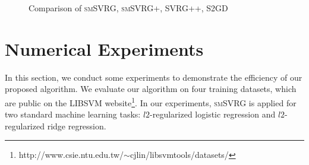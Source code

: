 \documentclass[conference]{IEEEtran}
\begin{document}
 \begin{figure}[htb]
\centering
{}
\label{cmijcnn1}
\caption{Comparison of \textsc{smSVRG}, \textsc{smSVRG+}, SVRG++, S2GD}
\end{figure}
 
 \section{Numerical Experiments}
 In this section, we conduct some experiments to demonstrate the efficiency of our proposed algorithm. We evaluate our algorithm on four training datasets, which are public on the LIBSVM website\footnote{http://www.csie.ntu.edu.tw/$\sim$cjlin/libsvmtools/datasets/}. In our experiments, \textsc{smSVRG} is applied for two standard machine learning tasks: $l2$-regularized logistic regression and $l2$-regularized ridge regression.
 
\end{document}
